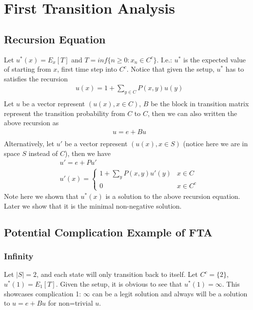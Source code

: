     

\section{First Transition Analysis}

\subsection{Recursion Equation} 
Let $u^*(x) = E_x[T]$ and $T=inf \{ n\geq 0: x_n \in C^c \}$. I.e.: $u^*$ is the expected value of starting from $x$, first time step into $C^c$. Notice that given the setup, $u^*$ has to satisfies the recursion 
    \begin{align*}
        & u(x) = 1 + \sum_{y\in C}P(x,y) u(y)\\
    \end{align*}
Let $u$ be a vector represent $(u(x), x\in C)$, $B$ be the block in transition matrix represent the transition probability from $C$ to $C$, then we can also written the above recursion as 
    \begin{align*}
        & u = e + Bu\\
    \end{align*}
Alternatively, let $u'$ be a vector represent $(u(x), x \in S)$ (notice here we are in space $S$ instead of $C$), then we have 
    \begin{align*}
       & u' = e + Pu'\\
       & u'(x) = 
           \begin{cases}
           1 + \sum_{y}P(x,y)u'(y) & x\in C \\
           0 & x \in C^c
           \end{cases}
    \end{align*}
Note here we shown that $u^*(x)$ is a solution to the above recursion equation. Later we show that it is the minimal non-negative solution. 

\subsection{Potential Complication Example of FTA} 

\subsubsection{Infinity} 
Let $|S|=2$, and each state will only transition back to itself. Let $C^c=\{2\}$, $u^*(1) = E_1[T]$. Given the setup, it is obvious to see that $u^*(1) = \infty$. This showcases complication 1: $\infty$ can be a legit solution and always will be a solution to $u = e + Bu$ for non=trivial $u$. 
